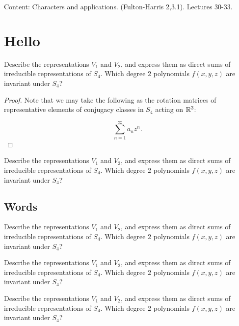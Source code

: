 \documentclass{notes}
\begin{document}
Content: Characters and applications. (Fulton-Harris 2,3.1). Lectures 30-33.
\section{Hello}

\lipsum[1]

\emph{\lipsum[2]}

\begin{theorem}
Describe the representations $V_1$ and $V_2$, and express them as direct sums of irreducible representations of $S_4$. Which degree 2 polynomials $f(x,y,z)$ are invariant under $S_4$?
\end{theorem}

\begin{proof}
Note that we may take the following as the rotation matrices of representative elements of conjugacy classes in $S_4$ acting on $\mathbb R^3$:

\[
	\boxed{\sum_{n=1}^{\infty} a_n z^n}
.\] 
\end{proof}

\begin{proposition}
Describe the representations $V_1$ and $V_2$, and express them as direct sums of irreducible representations of $S_4$. Which degree 2 polynomials $f(x,y,z)$ are invariant under $S_4$?
\end{proposition}

\subsection{Words}

\begin{corollary}
Describe the representations $V_1$ and $V_2$, and express them as direct sums of irreducible representations of $S_4$. Which degree 2 polynomials $f(x,y,z)$ are invariant under $S_4$?
\end{corollary}

\begin{lemma}
Describe the representations $V_1$ and $V_2$, and express them as direct sums of irreducible representations of $S_4$. Which degree 2 polynomials $f(x,y,z)$ are invariant under $S_4$?
\end{lemma}

\begin{defn}
Describe the representations $V_1$ and $V_2$, and express them as direct sums of irreducible representations of $S_4$. Which degree 2 polynomials $f(x,y,z)$ are invariant under $S_4$?
\end{defn}
\end{document}
